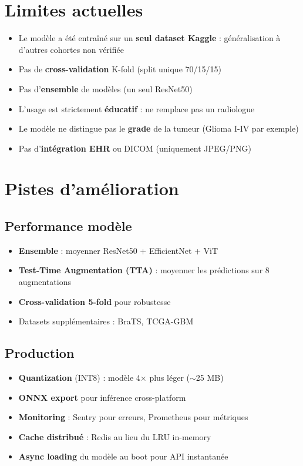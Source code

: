 \documentclass[11pt,a4paper,oneside]{report}
\begin{document}
\section{Limites actuelles}

\begin{warningbox}
\begin{itemize}
\item Le modèle a été entraîné sur un \textbf{seul dataset Kaggle} : généralisation à d'autres cohortes non vérifiée
\item Pas de \textbf{cross-validation} K-fold (split unique 70/15/15)
\item Pas d'\textbf{ensemble} de modèles (un seul ResNet50)
\item L'usage est strictement \textbf{éducatif} : ne remplace pas un radiologue
\item Le modèle ne distingue pas le \textbf{grade} de la tumeur (Glioma I-IV par exemple)
\item Pas d'\textbf{intégration EHR} ou DICOM (uniquement JPEG/PNG)
\end{itemize}
\end{warningbox}

\section{Pistes d'amélioration}

\subsection{Performance modèle}

\begin{itemize}
\item \textbf{Ensemble} : moyenner ResNet50 + EfficientNet + ViT
\item \textbf{Test-Time Augmentation (TTA)} : moyenner les prédictions sur 8 augmentations
\item \textbf{Cross-validation 5-fold} pour robustesse
\item Datasets supplémentaires : BraTS, TCGA-GBM
\end{itemize}

\subsection{Production}

\begin{itemize}
\item \textbf{Quantization} (INT8) : modèle 4$\times$ plus léger ($\sim$25 MB)
\item \textbf{ONNX export} pour inférence cross-platform
\item \textbf{Monitoring} : Sentry pour erreurs, Prometheus pour métriques
\item \textbf{Cache distribué} : Redis au lieu du LRU in-memory
\item \textbf{Async loading} du modèle au boot pour API instantanée
\end{itemize}
\end{document}
